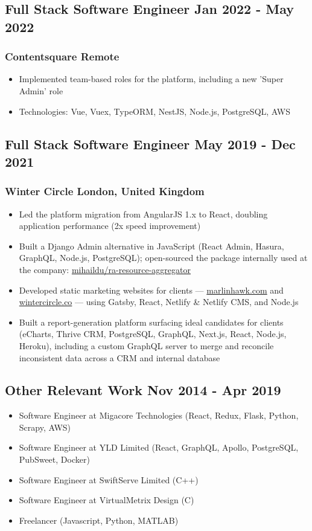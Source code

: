 \documentclass[11pt]{article} %
\begin{document}
\subsection{Full Stack Software Engineer \hfill Jan 2022 - May 2022}
\subsubsection{Contentsquare \hfill Remote}
\begin{itemize}
	\item Implemented team-based roles for the platform, including a new 'Super Admin' role
	\item Technologies: Vue, Vuex, TypeORM, NestJS, Node.js, PostgreSQL, AWS
\end{itemize}

\subsection{Full Stack Software Engineer \hfill May 2019 - Dec 2021}
\subsubsection{Winter Circle \hfill London, United Kingdom}
\begin{itemize}
	\item Led the platform migration from AngularJS 1.x to React, doubling application performance (2x speed improvement)
	\item Built a Django Admin alternative in JavaScript (React Admin, Hasura, GraphQL, Node.js, PostgreSQL); open-sourced the package internally used at the company: \href{https://github.com/mihaildu/ra-resource-aggregator}{mihaildu/ra-resource-aggregator}
	\item Developed static marketing websites for clients — \href{https://www.marlinhawk.com/}{marlinhawk.com} and \href{https://www.wintercircle.co/}{wintercircle.co} — using Gatsby, React, Netlify \& Netlify CMS, and Node.js
	\item Built a report-generation platform surfacing ideal candidates for clients (eCharts, Thrive CRM, PostgreSQL, GraphQL, Next.js, React, Node.js, Heroku), including a custom GraphQL server to merge and reconcile inconsistent data across a CRM and internal database
\end{itemize}

\subsection{Other Relevant Work \hfill Nov 2014 - Apr 2019}
\begin{itemize}
	\item Software Engineer at Migacore Technologies (React, Redux, Flask, Python, Scrapy, AWS)
	\item Software Engineer at YLD Limited (React, GraphQL, Apollo, PostgreSQL, PubSweet, Docker)
	\item Software Engineer at SwiftServe Limited (C++)
	\item Software Engineer at VirtualMetrix Design (C)
	\item Freelancer (Javascript, Python, MATLAB)
\end{itemize}
\end{document}
